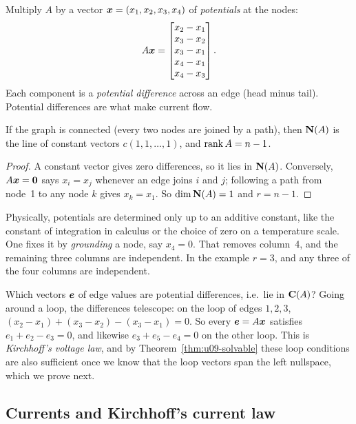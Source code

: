 Multiply $A$ by a vector $\boldsymbol{x}=(x_1,x_2,x_3,x_4)$ of \emph{potentials} at the nodes:
\[
A\boldsymbol{x}=\begin{bmatrix}x_2-x_1\\x_3-x_2\\x_3-x_1\\x_4-x_1\\x_4-x_3\end{bmatrix}.
\]
Each component is a \emph{potential difference} across an edge (head minus tail). Potential
differences are what make current flow.

\begin{proposition}\label{prop:u13-null}
If the graph is connected (every two nodes are joined by a path), then $\mathbf{N}(A)$ is the line of
constant vectors $c(1,1,\dots,1)$, and $\operatorname{rank} A=n-1$.
\end{proposition}
\begin{proof}
A constant vector gives zero differences, so it lies in $\mathbf{N}(A)$. Conversely, $A\boldsymbol{x}=\boldsymbol{0}$
says $x_i=x_j$ whenever an edge joins $i$ and $j$; following a path from node~1 to any node $k$
gives $x_k=x_1$. So $\dim\mathbf{N}(A)=1$ and $r=n-1$.
\end{proof}

Physically, potentials are determined only up to an additive constant, like the constant of
integration in calculus or the choice of zero on a temperature scale. One fixes it by
\emph{grounding} a node, say $x_4=0$. That removes column~4, and the remaining three columns are
independent. In the example $r=3$, and any three of the four columns are independent.

Which vectors $\boldsymbol{e}$ of edge values are potential differences, i.e.\ lie in $\mathbf{C}(A)$? Going around
a loop, the differences telescope: on the loop of edges $1,2,3$,
$(x_2-x_1)+(x_3-x_2)-(x_3-x_1)=0$. So every $\boldsymbol{e}=A\boldsymbol{x}$ satisfies $e_1+e_2-e_3=0$, and
likewise $e_3+e_5-e_4=0$ on the other loop. This is \emph{Kirchhoff's voltage law}, and by
Theorem~\ref{thm:u09-solvable} these loop conditions are also sufficient once we know that the loop
vectors span the left nullspace, which we prove next.

\subsection{Currents and Kirchhoff's current law}

